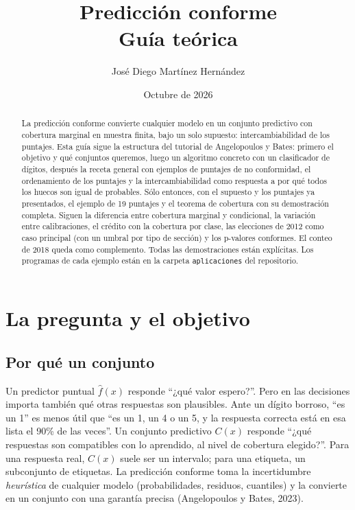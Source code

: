 \documentclass[11pt]{article}
\title{Predicción conforme\\\large Guía teórica}
\author{José Diego Martínez Hernández}
\date{Octubre de 2026}
\theoremstyle{plain}
\theoremstyle{definition}
\theoremstyle{remark}
\newcommand{\lamina}[1]{}%
\begin{document}
\maketitle
\begin{abstract}
La predicción conforme convierte cualquier modelo en un conjunto predictivo con cobertura marginal
en muestra finita, bajo un solo supuesto: intercambiabilidad de los puntajes. Esta guía sigue la
estructura del tutorial de Angelopoulos y Bates:
primero el objetivo y qué conjuntos queremos, luego un algoritmo concreto con un clasificador de
dígitos, después la receta general con ejemplos de puntajes de no conformidad, el ordenamiento de los
puntajes y la intercambiabilidad como respuesta a por qué todos los huecos son igual de probables. Sólo
entonces, con el supuesto y los puntajes ya presentados, el ejemplo de 19 puntajes y el teorema de
cobertura con su demostración completa. Siguen la diferencia entre cobertura marginal y condicional, la variación entre
calibraciones, el crédito con la cobertura por clase, las elecciones de 2012 como caso principal (con
un umbral por tipo de sección) y los p-valores conformes. El conteo de 2018 queda como complemento. Todas las demostraciones están explícitas. Los
programas de cada ejemplo están en la carpeta \texttt{aplicaciones} del repositorio.
\end{abstract}
\setcounter{tocdepth}{1}
\tableofcontents
\newpage

\section{La pregunta y el objetivo}\label{sec:objetivo}\lamina{2--6}
\subsection{Por qué un conjunto}
Un predictor puntual $\widehat f(x)$ responde ``¿qué valor espero?''. Pero en las decisiones importa
también qué otras respuestas son plausibles. Ante un dígito borroso, ``es un 1'' es menos útil que
``es un 1, un 4 o un 5, y la respuesta correcta está en esa lista el 90\% de las veces''. Un conjunto
predictivo $C(x)$ responde ``¿qué respuestas son compatibles con lo aprendido, al nivel de cobertura
elegido?''. Para una respuesta real, $C(x)$ suele ser un intervalo; para una etiqueta, un subconjunto
de etiquetas. La predicción conforme toma la incertidumbre \emph{heurística} de cualquier modelo
(probabilidades, residuos, cuantiles) y la convierte en un conjunto con una garantía precisa
(Angelopoulos y Bates, 2023).
\end{document}
